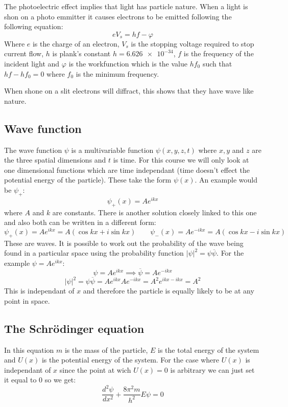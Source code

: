 \documentclass{article}
\newcommand{\dv}[3][]{\frac{d^{#1}{#2}}{d{#3}^{#1}}}
\newcommand{\cc}[1]{\overline{#1}}
\newcounter{example}[section]
\begin{document}
The photoelectric effect implies that light has particle nature. When a light is shon on a photo emmitter it causes electrons to be emitted following the following equation:
\[eV_s=hf-\varphi\]
Where \(e\) is the charge of an electron, \(V_s\) is the stopping voltage required to stop current flow, \(h\) is plank's constant \(h=\num{6.626e-34}\), \(f\) is the frequency of the incident light and \(\varphi\) is the workfunction which is the value \(hf_0\) such that \(hf-hf_0=0\) where \(f_0\) is the minimum frequency.

When shone on a slit electrons will diffract, this shows that they have wave like nature.

\subsection*{Wave function}

The wave function \(\psi\) is a multivariable function \(\psi(x,y,z,t)\) where \(x,y\) and \(z\) are the three spatial dimensions and \(t\) is time. For this course we will only look at one dimensional functions which are time independant (time doesn't effect the potential energy of the particle). These take the form \(\psi(x)\). An example would be \(\psi_+\):
\[\psi_+(x)=Ae^{ikx}\]
where \(A\) and \(k\) are constants. There is another solution closely linked to this one and also both can be written in a different form:
\[\psi_+(x)=Ae^{ikx}=A(\cos kx+i\sin kx)\qquad\psi_-(x)=Ae^{-ikx}=A(\cos kx-i\sin kx)\]
These are waves. It is possible to work out the probability of the wave being found in a particular space using the probability function \(|\psi|^2=\psi\cc\psi\). For the example \(\psi=Ae^{ikx}\):
\[\psi=Ae^{ikx}\implies\cc\psi=Ae^{-ikx}\]
\[|\psi|^2=\psi\cc\psi=Ae^{ikx}Ae^{-ikx}=A^2e^{ikx-ikx}=A^2\]
This is independant of \(x\) and therefore the particle is equally likely to be at any point in space.

\subsection*{The Schr\"odinger equation}

\begin{center}
\boxed{\dv[2]{\psi}{x}+\frac{8\pi^2m}{h^2}[E-U(x)]\psi=0}
\end{center}

In this equation \(m\) is the mass of the particle, \(E\) is the total energy of the system and \(U(x)\) is the potential energy of the system. For the case where \(U(x)\) is independant of \(x\) since the point at wich \(U(x)=0\) is arbitrary we can just set it equal to 0 so we get:
\[\dv[2]{\psi}{x}+\frac{8\pi^2m}{h^2}E\psi=0\]
\end{document}
